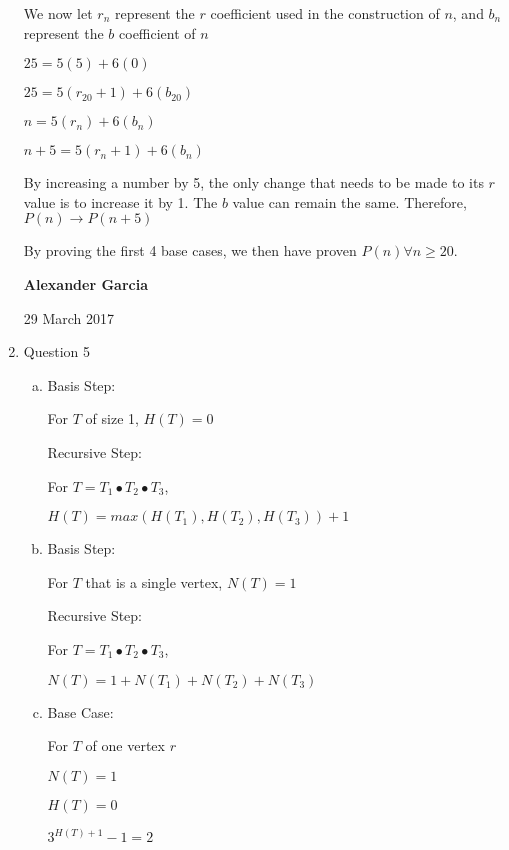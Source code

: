\documentclass[11pt]{article}
\begin{document}
\begin{enumerate}
		We now let $r_n$ represent the $r$ coefficient
		used in the construction of $n$, and $b_n$
		represent the $b$ coefficient of $n$

		$25 = 5(5) + 6(0)$

		$25 = 5(r_{20}+1) + 6(b_{20})$

		$n = 5(r_n) + 6(b_n)$

		$n+5 = 5(r_n + 1) + 6(b_n)$

		By increasing a number by 5, the only change that
		needs to be made to its $r$ value is to increase
		it by 1. The $b$ value can remain the same.
		Therefore, $P(n) \rightarrow P(n+5)$

		By proving the first 4 base cases, we then have
		proven $P(n) \forall n \geq 20$.

		\newpage

		\textbf{Alexander Garcia}

		29 March 2017 \\

	\item Question 5

		\begin{enumerate}[(a)]

			\item

				Basis Step:

				For $T$ of size 1, $H(T) = 0$

				Recursive Step:

				For $T = T_1 \bullet T_2 \bullet
				T_3$,

				$H(T) =
				max(H(T_1), H(T_2), H(T_3)) + 1$ \\

			\item

				Basis Step:

				For $T$ that is a single vertex,
				$N(T) = 1$

				Recursive Step:

				For $T = T_1 \bullet T_2 \bullet
				T_3$,

				$N(T)=1+N(T_1) + N(T_2) + N(T_3)$\\

			\item

		Base Case:

		For $T$ of one vertex $r$

		$N(T) = 1$

		$H(T) = 0$

		$3^{H(T)+1}-1 = 2$


\end{enumerate}
\end{enumerate}
\end{document}
